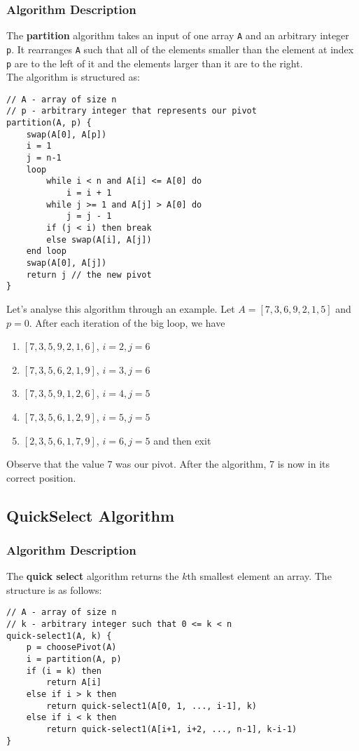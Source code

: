 \documentclass{report}
\begin{document}
\subsubsection{Algorithm Description}
The \textbf{partition} algorithm takes an input of one array \texttt{A} and an arbitrary integer \texttt{p}. It rearranges \texttt{A} such that all of the elements smaller than the element at index \texttt{p} are to the left of it and the elements larger than it are to the right.\\
The algorithm is structured as: 
\begin{lstlisting}
// A - array of size n
// p - arbitrary integer that represents our pivot
partition(A, p) {
	swap(A[0], A[p])
	i = 1
	j = n-1
	loop
		while i < n and A[i] <= A[0] do
			i = i + 1
		while j >= 1 and A[j] > A[0] do
			j = j - 1
		if (j < i) then break
		else swap(A[i], A[j])
	end loop
	swap(A[0], A[j])
	return j // the new pivot
}
\end{lstlisting}
Let's analyse this algorithm through an example. Let $A = [7, 3, 6, 9, 2, 1, 5]$ and $p=0$. After each iteration of the big loop, we have
\begin{enumerate}
\item $[7, 3, 5, 9, 2, 1, 6]$, $i = 2, j = 6$
\item $[7, 3, 5, 6, 2, 1, 9]$, $i = 3, j = 6$
\item $[7, 3, 5, 9, 1, 2, 6]$, $i = 4, j = 5$
\item $[7, 3, 5, 6, 1, 2, 9]$, $i = 5, j = 5$
\item $[2, 3, 5, 6, 1, 7, 9]$, $i = 6, j = 5$ and then exit
\end{enumerate}
Observe that the value 7 was our pivot. After the algorithm, 7 is now in its correct position.
\subsection{QuickSelect Algorithm}
\subsubsection{Algorithm Description}
The \textbf{quick select} algorithm returns the $k$th smallest element an array. The structure is as follows:
\begin{lstlisting}
// A - array of size n
// k - arbitrary integer such that 0 <= k < n
quick-select1(A, k) {
	p = choosePivot(A)
	i = partition(A, p)
	if (i = k) then
		return A[i]
	else if i > k then
		return quick-select1(A[0, 1, ..., i-1], k)
	else if i < k then
		return quick-select1(A[i+1, i+2, ..., n-1], k-i-1)
}
\end{lstlisting}
\end{document}

